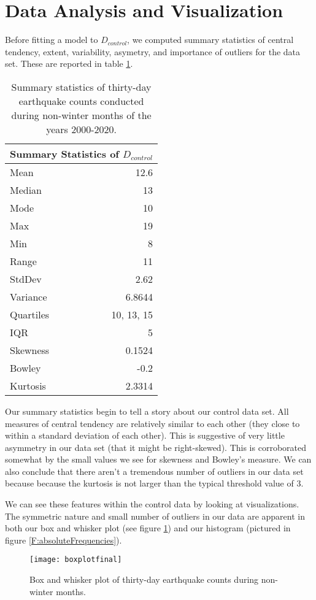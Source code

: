 \documentclass{amsart}
\begin{document}
\section{Data Analysis and Visualization}
Before fitting a model to $D_{control}$, we computed summary statistics of central tendency, extent, variability, asymetry, and importance of outliers for the data set. These are reported in table \ref{Tbl:statistics}.
\begin{table}[h]
\centering
\begin{tabular}{lr}
\toprule
\multicolumn{2}{c}{\textbf{Summary Statistics of $D_{control}$}}\\
\midrule
Mean & 12.6 \\
Median& 13\\
Mode& 10\\
Max& 19\\
Min& 8\\
Range& 11\\
StdDev& 2.62\\
Variance& 6.8644\\
Quartiles& 10, 13, 15\\
IQR& 5\\
Skewness& 0.1524\\
Bowley& -0.2\\
Kurtosis& 2.3314\\
\bottomrule
\end{tabular}
\caption{Summary statistics of thirty-day earthquake counts conducted during non-winter months of the years 2000-2020.\label{Tbl:statistics}}
\end{table}
Our summary statistics begin to tell a story about our control data set. All measures of central tendency are relatively similar to each other (they close to within a standard deviation of each other). This is suggestive of very little asymmetry in our data set (that it might be right-skewed). This is corroborated somewhat by the small values we see for skewness and Bowley's measure. We can also conclude that there aren't a tremendous number of outliers in our data set because because the kurtosis is not larger than the typical threshold value of 3.

We can see these features within the control data by looking at visualizations. The symmetric nature and small number of outliers in our data are apparent in both our box and whisker plot (see figure \ref{F:BoxAndWhiskerEarthquake}) and our histogram (pictured in figure \ref{F:absoluteFrequencies}).
\begin{figure}
\centering
\texttt{[image: boxplotfinal]}
\caption{Box and whisker plot of thirty-day earthquake counts during non-winter months.\label{F:BoxAndWhiskerEarthquake}}
\end{figure}
\end{document}
